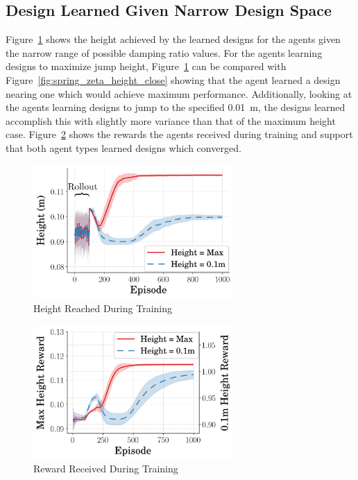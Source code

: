 \documentclass[10pt,twocolumn,letterpaper]{article}
\begin{document}
\subsection{Design Learned Given Narrow Design Space}

Figure~\ref{fig:height_vs_step_close} shows the height achieved by the learned designs for the agents given the narrow range of possible damping ratio values. For the agents learning designs to maximize jump height, Figure~\ref{fig:height_vs_step_close} can be compared with Figure~\ref{fig:spring_zeta_height_close} showing that the agent learned a design nearing one which would achieve maximum performance. Additionally, looking at the agents learning designs to jump to the specified 0.01~m, the designs learned accomplish this with slightly more variance than that of the maximum height case. Figure~\ref{fig:rew_vs_step_close} shows the rewards the agents received during training and support that both agent types learned designs which converged. 
%
\begin{figure}[tb]
        \begin{center}
        \includegraphics[width = 3in]{figures/design_space_narr/HeightVsTime.png}  
        \caption{Height Reached During Training}
        \label{fig:height_vs_step_close}
        \end{center}
        \end{figure}
%
\begin{figure}[tb]
        \begin{center}
        \includegraphics[width = 3in]{figures/design_space_narr/RewVsTime.png}  
        \caption{Reward Received During Training}
        \label{fig:rew_vs_step_close}
        \end{center}
        \end{figure}
%
\end{document}
